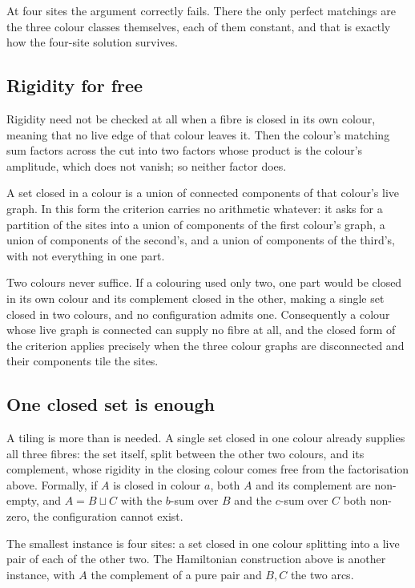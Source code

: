 \documentclass[11pt]{article}
\theoremstyle{definition}
\theoremstyle{remark}
\begin{document}
At four sites the argument correctly fails.  There the only perfect matchings are the three colour
classes themselves, each of them constant, and that is exactly how the four-site solution survives.

\subsection*{Rigidity for free}

Rigidity need not be checked at all when a fibre is closed in its own colour, meaning that no live
edge of that colour leaves it.  Then the colour's matching sum factors across the cut into two
factors whose product is the colour's amplitude, which does not vanish; so neither factor does.

A set closed in a colour is a union of connected components of that colour's live graph.  In this
form the criterion carries no arithmetic whatever: it asks for a partition of the sites into a union
of components of the first colour's graph, a union of components of the second's, and a union of
components of the third's, with not everything in one part.

Two colours never suffice.  If a colouring used only two, one part would be closed in its own colour
and its complement closed in the other, making a single set closed in two colours, and no
configuration admits one.  Consequently a colour whose live graph is connected can supply no fibre at
all, and the closed form of the criterion applies precisely when the three colour graphs are
disconnected and their components tile the sites.

\subsection*{One closed set is enough}

A tiling is more than is needed.  A single set closed in one colour already supplies all three
fibres: the set itself, split between the other two colours, and its complement, whose rigidity in
the closing colour comes free from the factorisation above.  Formally, if $A$ is closed in colour
$a$, both $A$ and its complement are non-empty, and $A = B \sqcup C$ with the $b$-sum over $B$ and the
$c$-sum over $C$ both non-zero, the configuration cannot exist.

The smallest instance is four sites: a set closed in one colour splitting into a live pair of each of
the other two.  The Hamiltonian construction above is another instance, with $A$ the complement of a
pure pair and $B, C$ the two arcs.
\end{document}
